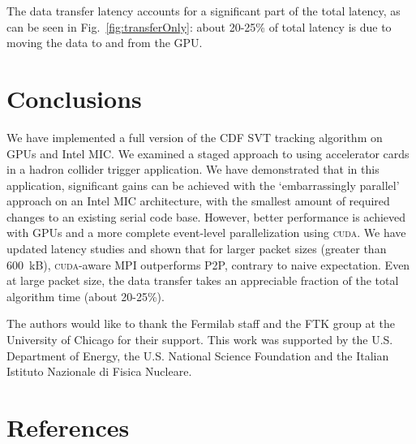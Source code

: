 \documentclass[a4]{jpconf}
\begin{document}
The data transfer latency accounts for a significant part of the total
latency, as can be seen in Fig.~\ref{fig:transferOnly}: about 20-25\%
of total latency is due to moving the data to and from the GPU.


\section{Conclusions}
We have implemented a full version of the CDF SVT tracking algorithm
on GPUs and Intel MIC. We examined a staged approach to using
accelerator cards in a hadron collider trigger application. We have
demonstrated that in this application, significant gains can be
achieved with the `embarrassingly parallel' approach on an Intel MIC
architecture, with the smallest amount of required changes to an
existing serial code base. However, better performance is achieved
with GPUs and a more complete event-level parallelization using
\textsc{cuda}.  We have updated latency studies and shown that for
larger packet sizes (greater than 600~kB), \textsc{cuda}-aware MPI
outperforms P2P, contrary to naive expectation.  Even at large packet
size, the data transfer takes an appreciable fraction of the total
algorithm time (about 20-25\%).

\ack
The authors would like to thank the Fermilab staff and the FTK group at the 
University of Chicago for their support. This work was supported by the
U.S. Department of Energy, the U.S. National Science Foundation and the Italian
Istituto Nazionale di Fisica Nucleare. 

\section*{References}







 
\end{document}
